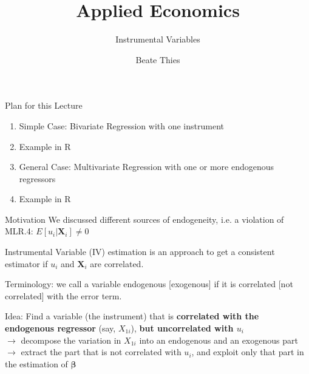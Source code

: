 \documentclass[11pt, aspectratio = 169]{beamer}
\title{Applied Economics}
\subtitle{Instrumental Variables}
\author{Beate Thies}
\date{}
\institute{Winter 2024/25}
\begin{document}


\maketitle
\sffamily

\begin{frame}{Plan for this Lecture}
\begin{enumerate}


\item Simple Case: Bivariate Regression with one instrument

\item Example in R

\item General Case: Multivariate Regression with one or more endogenous regressors

\item Example in R

\end{enumerate}
\end{frame}



\begin{frame}{Motivation}
We discussed different sources of \alert{endogeneity}, i.e. a violation of MLR.4: $E[u_i | \boldsymbol{X}_i] \neq 0$

Instrumental Variable (IV) estimation is an approach to get a consistent estimator if $u_i$ and $\boldsymbol{X}_i$ are correlated.
\pause

Terminology: we call a variable endogenous [\color{blue}exogenous\color{black}] if it is correlated [\color{blue}not correlated\color{black}] with the error term.

\pause
Idea: Find a variable (the instrument) that is \textbf{correlated with the endogenous regressor} (say, $X_{1i}$), \textbf{but uncorrelated with $u_i$} \\
$\rightarrow$ decompose the variation in $X_{1i}$ into an endogenous and an exogenous part \\
$\rightarrow$ extract the part that is not correlated with $u_i$, and exploit only that part in the estimation of $\boldsymbol{\beta}$
\end{frame}
\end{document}
